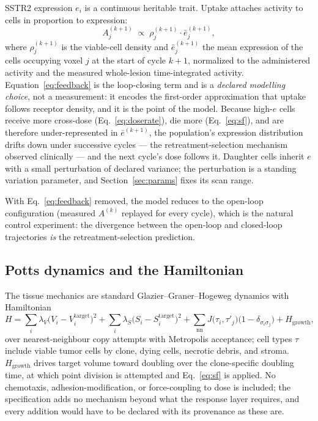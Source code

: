 \documentclass[11pt]{article}
\begin{document}
SSTR2 expression $e_i$ is a continuous heritable trait. Uptake attaches activity to cells
in proportion to expression:
\begin{equation}
A^{(k+1)}_j \;\propto\; \rho^{(k+1)}_j \cdot \bar{e}^{(k+1)}_j ,
\label{eq:feedback}
\end{equation}
where $\rho^{(k+1)}_j$ is the viable-cell density and $\bar{e}^{(k+1)}_j$ the mean
expression of the cells occupying voxel $j$ at the start of cycle $k{+}1$, normalized to
the administered activity and the measured whole-lesion time-integrated activity.
Equation~\ref{eq:feedback} is the loop-closing term and is a \emph{declared modelling
choice}, not a measurement: it encodes the first-order approximation that uptake follows
receptor density, and it is the point of the model. Because high-$e$ cells receive more
cross-dose (Eq.~\ref{eq:doserate}), die more (Eq.~\ref{eq:sf}), and are therefore
under-represented in $\bar{e}^{(k+1)}$, the population's expression distribution drifts
down under successive cycles --- the retreatment-selection mechanism observed clinically
\cite{feijtel2021,fransson2024} --- and the next cycle's dose follows it. Daughter cells
inherit $e$ with a small perturbation of declared variance; the perturbation is a
standing variation parameter, and Section~\ref{sec:params} fixes its scan range.

With Eq.~\ref{eq:feedback} removed, the model reduces to the open-loop configuration
(measured $A^{(k)}$ replayed for every cycle), which is the natural control experiment:
the divergence between the open-loop and closed-loop trajectories \emph{is} the
retreatment-selection prediction.

\subsection{Potts dynamics and the Hamiltonian}

The tissue mechanics are standard Glazier--Graner--Hogeweg dynamics with Hamiltonian
\begin{equation}
H = \sum_i \lambda_V \bigl(V_i - V_i^{\text{target}}\bigr)^2
  + \sum_i \lambda_S \bigl(S_i - S_i^{\text{target}}\bigr)^2
  + \sum_{\text{nn}} J\bigl(\tau_i, \tau'_j\bigr)\bigl(1 - \delta_{\sigma_i \sigma_j}\bigr)
  + H_{\text{growth}},
\label{eq:hamiltonian}
\end{equation}
over nearest-neighbour copy attempts with Metropolis acceptance; cell types $\tau$
include viable tumor cells by clone, dying cells, necrotic debris, and stroma.
$H_{\text{growth}}$ drives target volume toward doubling over the clone-specific
doubling time, at which point division is attempted and Eq.~\ref{eq:sf} is applied.
No chemotaxis, adhesion-modification, or force-coupling to dose is included; the
specification adds no mechanism beyond what the response layer requires, and every
addition would have to be declared with its provenance as these are.
\end{document}
